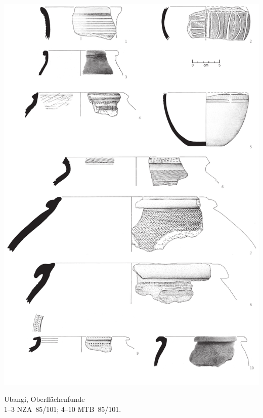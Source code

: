 \begin{pl}[H]
	\includegraphics{plt/Taf11.pdf}
	\vspace{.75em}\caption{\mbox{Ubangi}, Oberflächenfunde \\ 1--3 NZA~85/101; 4--10 MTB~85/101.}
	\label{pl:11}
\end{pl}

